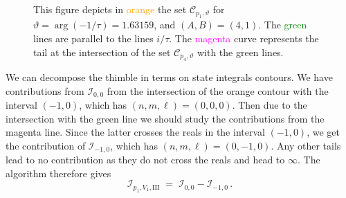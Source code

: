 \documentclass[12pt,reqno]{amsart}
\theoremstyle{definition}
\def\calI{\mathcal I}
\def\calC{\mathcal C}
\def\be{\begin{equation}}
\def\ee{\end{equation}}
\renewcommand{\=}{\;=\;}
\begin{document}
\begin{figure}[ht]
\begin{tiny}
\end{tiny}
\caption{This figure depicts in \textcolor{orange}{orange} the set $\calC_{p_1,\vartheta}$ for $\vartheta=\arg(-1/\tau)=1.63159$, and $(A,B)=(4,1)$. The \textcolor{green}{green} lines are parallel to the lines $i/\tau$. The \textcolor{magenta}{magenta} curve represents the tail at the intersection of the set $\calC_{p_4,\vartheta}$ with the green lines.}
\label{fig:thimb.A4B1.III}
\end{figure}
We can decompose the thimble in terms on state integrals contours. We have contributions from $\calI_{0,0}$ from the intersection of the orange contour with the interval $(-1,0)$, which has $(n,m,\ell)=(0,0,0)$. Then due to the intersection with the green line we should study the contributions from the magenta line. Since the latter crosses the reals in the interval $(-1,0)$, we get the contribution of $\calI_{-1,0}$, which has $(n,m,\ell)=(0,-1,0)$. Any other tails lead to no contribution as they do not cross the reals and head to $\infty$. The algorithm therefore gives
\be\label{eq:region_III_A4B1}
\calI_{p_1,V_1,\mathrm{III}}
\=
\calI_{0,0}-\calI_{-1,0}\,.
\ee
%
\end{document}
